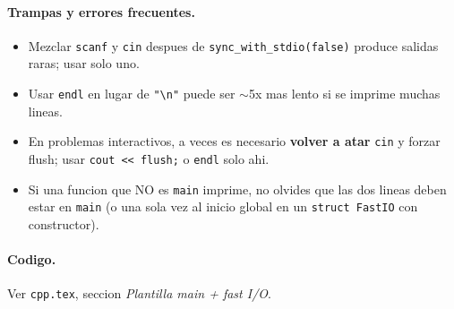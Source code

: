 \paragraph{Trampas y errores frecuentes.}
\begin{itemize}\setlength\itemsep{0pt}
	\item Mezclar \texttt{scanf} y \texttt{cin} despues de \texttt{sync\_with\_stdio(false)} produce salidas raras; usar solo uno.
	\item Usar \texttt{endl} en lugar de \texttt{"\textbackslash n"} puede ser $\sim$5x mas lento si se imprime muchas lineas.
	\item En problemas interactivos, a veces es necesario \textbf{volver a atar} \texttt{cin} y forzar flush; usar \texttt{cout << flush;} o \texttt{endl} solo ahi.
	\item Si una funcion que NO es \texttt{main} imprime, no olvides que las dos lineas deben estar en \texttt{main} (o una sola vez al inicio global en un \texttt{struct FastIO} con constructor).
\end{itemize}

\paragraph{Codigo.}
Ver \texttt{cpp.tex}, seccion \textit{Plantilla main + fast I/O}.

\vspace{0.5em}
